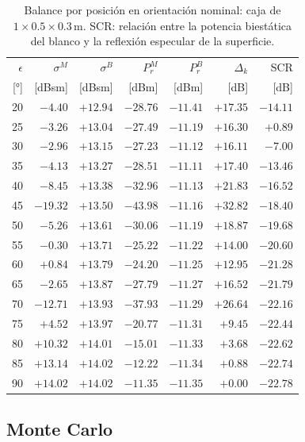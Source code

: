 \documentclass[11pt,a4paper]{report}
\begin{document}
\begin{table}[H]
\centering
\caption{Balance por posición en orientación nominal: caja de $1\times0.5\times0.3$\,m. SCR: relación entre la potencia biestática del blanco y la reflexión especular de la superficie.}
\label{tab:caja_nominal}
\small
\begin{tabular}{@{}rrrrrrr@{}}
\toprule
$\epsilon$ & $\sigma^M$ & $\sigma^B$ & $P_r^M$ & $P_r^B$ & $\Delta_k$ & SCR \\
{[°]} & [dBsm] & [dBsm] & [dBm] & [dBm] & [dB] & [dB] \\
\midrule
20 & $-4.40$ & $+12.94$ & $-28.76$ & $-11.41$ & $+17.35$ & $-14.11$ \\
25 & $-3.26$ & $+13.04$ & $-27.49$ & $-11.19$ & $+16.30$ & $+0.89$ \\
30 & $-2.96$ & $+13.15$ & $-27.23$ & $-11.12$ & $+16.11$ & $-7.00$ \\
35 & $-4.13$ & $+13.27$ & $-28.51$ & $-11.11$ & $+17.40$ & $-13.46$ \\
40 & $-8.45$ & $+13.38$ & $-32.96$ & $-11.13$ & $+21.83$ & $-16.52$ \\
45 & $-19.32$ & $+13.50$ & $-43.98$ & $-11.16$ & $+32.82$ & $-18.40$ \\
50 & $-5.26$ & $+13.61$ & $-30.06$ & $-11.19$ & $+18.87$ & $-19.68$ \\
55 & $-0.30$ & $+13.71$ & $-25.22$ & $-11.22$ & $+14.00$ & $-20.60$ \\
60 & $+0.84$ & $+13.79$ & $-24.20$ & $-11.25$ & $+12.95$ & $-21.28$ \\
65 & $-2.65$ & $+13.87$ & $-27.79$ & $-11.27$ & $+16.52$ & $-21.79$ \\
70 & $-12.71$ & $+13.93$ & $-37.93$ & $-11.29$ & $+26.64$ & $-22.16$ \\
75 & $+4.52$ & $+13.97$ & $-20.77$ & $-11.31$ & $+9.45$ & $-22.44$ \\
80 & $+10.32$ & $+14.01$ & $-15.01$ & $-11.33$ & $+3.68$ & $-22.62$ \\
85 & $+13.14$ & $+14.02$ & $-12.22$ & $-11.34$ & $+0.88$ & $-22.74$ \\
90 & $+14.02$ & $+14.02$ & $-11.35$ & $-11.35$ & $+0.00$ & $-22.78$ \\
\bottomrule
\end{tabular}
\end{table}

\subsection{Monte Carlo}
\end{document}
